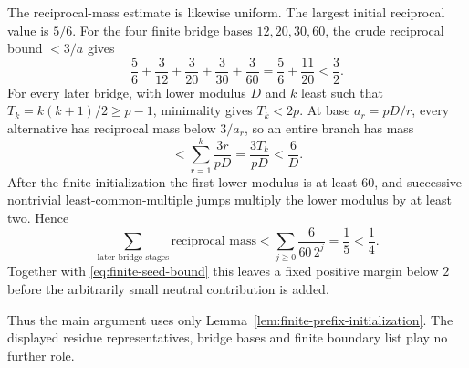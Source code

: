 The reciprocal-mass estimate is likewise uniform.  The largest initial reciprocal value is $5/6$.  For the four finite bridge bases $12,20,30,60$, the crude reciprocal bound $<3/a$ gives
\begin{equation}\label{eq:finite-seed-bound}
\frac56+\frac3{12}+\frac3{20}+\frac3{30}+\frac3{60}
=\frac56+\frac{11}{20}<\frac32.
\end{equation}
For every later bridge, with lower modulus $D$ and $k$ least such that $T_k=k(k+1)/2\ge p-1$, minimality gives $T_k<2p$.  At base $a_r=pD/r$, every alternative has reciprocal mass below $3/a_r$, so an entire branch has mass
\begin{equation}\label{eq:future-row-bound}
<\sum_{r=1}^k\frac{3r}{pD}
=\frac{3T_k}{pD}
<\frac6D.
\end{equation}
After the finite initialization the first lower modulus is at least $60$, and successive nontrivial least-common-multiple jumps multiply the lower modulus by at least two.  Hence
\begin{equation}\label{eq:future-bridge-total}
\sum_{\text{later bridge stages}}\text{reciprocal mass}
<\sum_{j\ge0}\frac6{60\,2^j}
=\frac15<\frac14.
\end{equation}
Together with \eqref{eq:finite-seed-bound} this leaves a fixed positive margin below $2$ before the arbitrarily small neutral contribution is added.

Thus the main argument uses only Lemma~\ref{lem:finite-prefix-initialization}.  The displayed residue representatives, bridge bases and finite boundary list play no further role.
